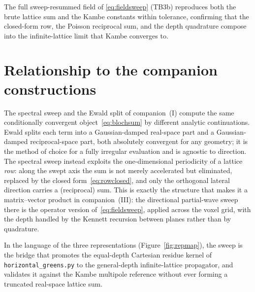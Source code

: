 \documentclass[11pt,a4paper]{article}
\begin{document}
The full sweep-resummed field of \eqref{eq:fieldsweep} (TB3b) reproduces both
the brute lattice sum and the Kambe constants within tolerance, confirming that
the closed-form row, the Poisson reciprocal sum, and the depth quadrature
compose into the infinite-lattice limit that Kambe converges to.

\section{Relationship to the companion constructions}
\label{sec:lineage}

The spectral sweep and the Ewald split of companion~(I) compute the same
conditionally convergent object~\eqref{eq:blochsum} by different analytic
continuations. Ewald splits each term into a Gaussian-damped real-space part and
a Gaussian-damped reciprocal-space part, both absolutely convergent for any
geometry; it is the method of choice for a fully irregular evaluation and is
agnostic to direction. The spectral sweep instead exploits the one-dimensional
periodicity of a lattice \emph{row}: along the swept axis the sum is not merely
accelerated but eliminated, replaced by the closed form~\eqref{eq:rowclosed},
and only the orthogonal lateral direction carries a (reciprocal) sum. This is
exactly the structure that makes it a matrix--vector product in companion~(III):
the directional partial-wave sweep there is the operator version
of~\eqref{eq:fieldsweep}, applied across the voxel grid, with the depth handled
by the Kennett recursion between planes rather than by quadrature.

In the language of the three representations (Figure~\ref{fig:repmap}), the
sweep is the bridge that promotes the equal-depth Cartesian residue kernel of
\texttt{horizontal\_\allowbreak greens.py} to the general-depth infinite-lattice propagator,
and validates it against the Kambe multipole reference without ever forming a
truncated real-space lattice sum.
\end{document}
